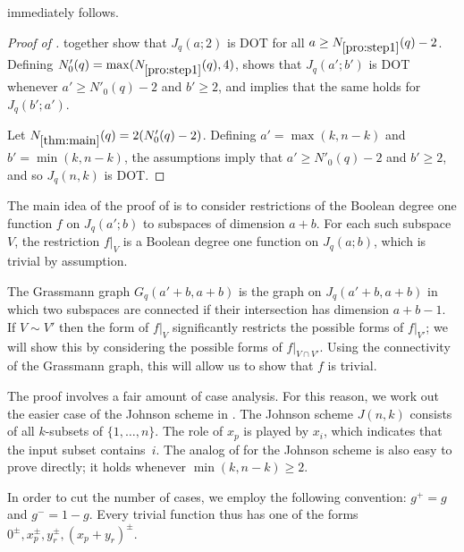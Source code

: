 \documentclass{article}
\theoremstyle{definition}
\providecommand{\Nmain}{N_{\ref{thm:main}}}
\providecommand{\Nlist}{N_{\ref{pro:step1}}}
\begin{document}
 immediately follows.

\begin{proof}[Proof of ]
 together show that $J_q(a;2)$ is DOT for all $a \ge \Nlist(q)-2$.
Defining $N'_0(q) = \max(\Nlist(q),4)$,  shows that $J_q(a';b')$ is DOT whenever $a' \ge N'_0(q)-2$ and $b' \ge 2$, and  implies that the same holds for $J_q(b';a')$.

Let $\Nmain(q) = 2(N'_0(q)-2)$. Defining $a' = \max(k,n-k)$ and $b' = \min(k,n-k)$, the assumptions imply that $a' \ge N'_0(q)-2$ and $b' \ge 2$, and so $J_q(n,k)$ is DOT. 
\end{proof}

\medskip

The main idea of the proof of  is to consider restrictions of the Boolean degree one function $f$ on $J_q(a';b)$ to subspaces of dimension $a+b$. For each such subspace $V$, the restriction $f|_V$ is a Boolean degree one function on $J_q(a;b)$, which is trivial by assumption. 

The Grassmann graph $G_q(a'+b,a+b)$ is the graph on $J_q(a'+b,a+b)$ in which two subspaces are connected if their intersection has dimension $a+b-1$. If $V \sim V'$ then the form of $f|_V$ significantly restricts the possible forms of $f|_{V'}$; we will show this by considering the possible forms of $f|_{V \cap V'}$. Using the connectivity of the Grassmann graph, this will allow us to show that $f$ is trivial.

The proof involves a fair amount of case analysis. For this reason, we work out the easier case of the Johnson scheme in . The Johnson scheme $J(n,k)$ consists of all $k$-subsets of $\{1,\dots,n\}$. The role of $x_p$ is played by $x_i$, which indicates that the input subset contains~$i$. The analog of  for the Johnson scheme is also easy to prove directly; it holds whenever $\min(k,n-k) \ge 2$.

In order to cut the number of cases, we employ the following convention: $g^+ = g$ and $g^- = 1-g$. Every trivial function thus has one of the forms $0^\pm,x_p^\pm,y_r^\pm,(x_p+y_r)^\pm$.
\end{document}
